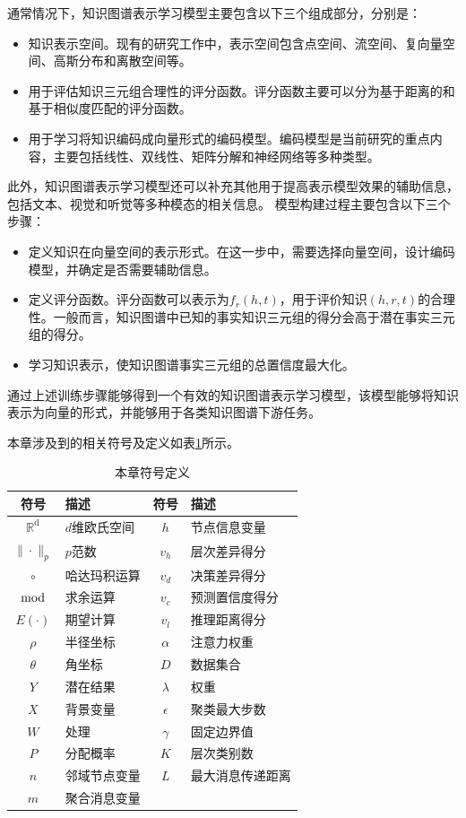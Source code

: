 \documentclass[algorithmlist, AutoFakeBold, AutoFakeSlant, figurelist, tablelist, nomlist, engineering]{seuthesix}
\begin{document}
通常情况下，知识图谱表示学习模型主要包含以下三个组成部分，分别是：
\begin{itemize}
  \item [1)] 知识表示空间。现有的研究工作中，表示空间包含点空间、流空间、复向量空间、高斯分布和离散空间等。
  \item [2)] 用于评估知识三元组合理性的评分函数。评分函数主要可以分为基于距离的和基于相似度匹配的评分函数。
  \item [3)] 用于学习将知识编码成向量形式的编码模型。编码模型是当前研究的重点内容，主要包括线性、双线性、矩阵分解和神经网络等多种类型。
\end{itemize}
此外，知识图谱表示学习模型还可以补充其他用于提高表示模型效果的辅助信息，包括文本、视觉和听觉等多种模态的相关信息。
模型构建过程主要包含以下三个步骤：
\begin{itemize}
  \item [1)] 定义知识在向量空间的表示形式。在这一步中，需要选择向量空间，设计编码模型，并确定是否需要辅助信息。
  \item [2)] 定义评分函数。评分函数可以表示为$f_r(h, t)$，用于评价知识$(h, r, t)$的合理性。一般而言，知识图谱中已知的事实知识三元组的得分会高于潜在事实三元组的得分。
  \item [3)] 学习知识表示，使知识图谱事实三元组的总置信度最大化。
\end{itemize}
通过上述训练步骤能够得到一个有效的知识图谱表示学习模型，该模型能够将知识表示为向量的形式，并能够用于各类知识图谱下游任务。

本章涉及到的相关符号及定义如表\ref{2_symbols}所示。
\begin{table}
  \centering
  \begin{tabular*}{0.8\textwidth}{@{\extracolsep{\fill}}clcl}
		\toprule[1pt]
    符号 & 描述 & 符号 & 描述 \\ \hline
    $\mathbb{R}^{\mathrm{d}}$ & $d$维欧氏空间 & $h$ & 节点信息变量\\
    $\|\cdot\|_{p}$ & $p$范数 & $v_h$ & 层次差异得分\\
    $\circ$ & 哈达玛积运算 & $v_d$ & 决策差异得分\\
    $\bmod$ & 求余运算 & $v_c$ & 预测置信度得分\\
    $E(\cdot)$ & 期望计算 & $v_l$ & 推理距离得分\\
    $\rho$ & 半径坐标 & $\alpha$ & 注意力权重\\
    $\theta$ & 角坐标 & $D$ & 数据集合\\
    $Y$ & 潜在结果 & $\lambda$ & 权重\\
    $X$ & 背景变量 & $\epsilon$ & 聚类最大步数\\
    $W$ & 处理 & $\gamma$ & 固定边界值\\
    $P$ & 分配概率 & $K$ & 层次类别数\\
    $n$ & 邻域节点变量 & $L$ & 最大消息传递距离\\
    $m$ & 聚合消息变量 & & \\
		\bottomrule[1pt]
	\end{tabular*}
  \caption{本章符号定义}
  \label{2_symbols}
\end{table}
\end{document}
